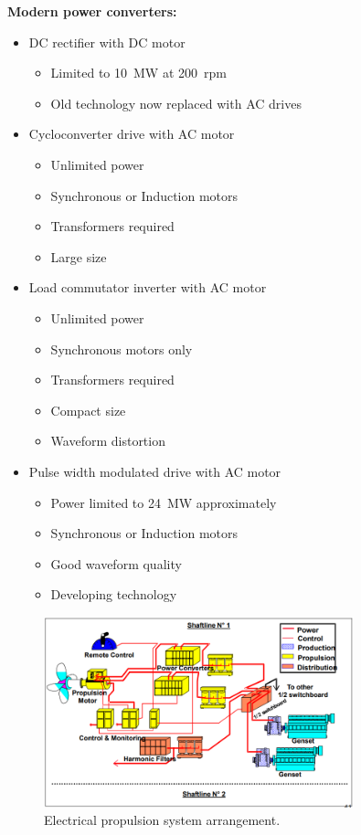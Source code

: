 \textbf{Modern power converters:}
\begin{itemize}
    \item DC rectifier with DC motor
          \begin{itemize}
              \item Limited to \SI{10}{\mega\watt} at \SI{200}{rpm}
              \item Old technology now replaced with AC drives
          \end{itemize}
    \item Cycloconverter drive with AC motor
          \begin{itemize}
              \item Unlimited power
              \item Synchronous or Induction motors
              \item Transformers required
              \item Large size
          \end{itemize}
    \item Load commutator inverter with AC motor
          \begin{itemize}
              \item Unlimited power
              \item Synchronous motors only
              \item Transformers required
              \item Compact size
              \item Waveform distortion
          \end{itemize}
    \item Pulse width modulated drive with AC motor
          \begin{itemize}
              \item Power limited to \SI{24}{\mega\watt} approximately
              \item Synchronous or Induction motors
              \item Good waveform quality
              \item Developing technology
          \end{itemize}
\end{itemize}

\begin{figure}[H]
    \centering
    \includegraphics[width = 0.8\textwidth]{img/figure64.png}
    \caption{Electrical propulsion system arrangement.}
\end{figure}

